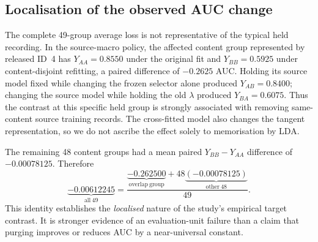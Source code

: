 \subsection{Localisation of the observed AUC change}
\label{sec:p2-local-effect}
The complete 49-group average loss is not representative of
the typical held recording. In the source-macro policy,
the affected content group represented by released ID~4
has $Y_{AA}=0.8550$ under the original fit and
$Y_{BB}=0.5925$ under content-disjoint refitting,
a paired difference of $-0.2625$ AUC.
Holding its source model fixed while changing the frozen
selector alone produced $Y_{AB}=0.8400$;
changing the source model while holding the old
$\lambda$ produced $Y_{BA}=0.6075$.
Thus the contrast at this specific held group is
strongly associated with removing same-content
source training records. The cross-fitted model also
changes the tangent representation, so we do not
ascribe the effect solely to memorisation by LDA.

The remaining 48 content groups had a mean paired
$Y_{BB}-Y_{AA}$ difference of $-0.00078125$.
Therefore
\[
\underbrace{-0.00612245}_{\mathrm{all}\ 49}
=
\frac{
\underbrace{-0.262500}_{\mathrm{overlap\ group}}
+48\underbrace{(-0.00078125)}_{\mathrm{other}\ 48}
}{49}.
\]
This identity establishes the \emph{localised}
nature of the study's empirical target contrast.
It is stronger evidence of an evaluation-unit
failure than a claim that purging improves or
reduces AUC by a near-universal constant.

